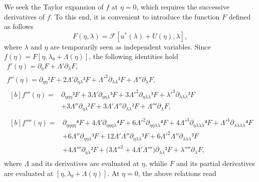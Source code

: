 \documentclass[12pt, final]{scrartcl}
\theoremstyle{definition}
\begin{document}
We seek the Taylor expansion of $f$ at $η = 0$, which requires the
successive derivatives of $f$. To this end, it is convenient to introduce the
function $F$ defined as follows
\begin{equation*}
  F(η, \lambda) =\mathcal{F}[u^{\ast}(\lambda) + U(η), \lambda],
\end{equation*}
where $\lambda$ and $η$ are temporarily seen as independent variables. Since
$f(η) = F[η, \lambda₀ + \Lambda(η)]$, the following identities hold
\begin{gather*}
  f'(η) = ∂_{η} F + \Lambda' ∂_{\lambda} F,\\
  f''(η) = ∂_{ηη}² F + 2\Lambda' ∂_{η\lambda}²F + \Lambda'^2 ∂_{\lambda\lambda}² F + \Lambda'' ∂_{\lambda} F,\\
  \begin{aligned}[b]
    f'''(η) ={}
    & ∂_{ηηη}³ F + 3\Lambda' ∂_{ηη\lambda}³F + 3\Lambda'^2 ∂_{η\lambda\lambda}³F + \lambda'^3 ∂_{\lambda\lambda\lambda}³ F\\
    & + 3\Lambda'' ∂_{η\lambda}² F + 3\Lambda' \Lambda'' ∂_{\lambda \lambda}² F + \Lambda''' ∂_{\lambda} F,
  \end{aligned}\\
  \begin{aligned}[b]
    f''''(η) ={}
    & ∂_{ηηηη}⁴ F + 4\Lambda' ∂_{ηηη\lambda}⁴F + 6\Lambda'^2 ∂_{ηη\lambda\lambda}⁴F + 4\Lambda'^3 ∂_{η\lambda\lambda\lambda}⁴F + \Lambda'^4 ∂_{\lambda\lambda\lambda\lambda}⁴ F\\
    & + 6\Lambda'' ∂_{ηη\lambda}³ F + 12\Lambda' \Lambda'' ∂_{η\lambda\lambda}³F + 6\Lambda'^2 \Lambda'' ∂_{\lambda\lambda\lambda}³ F\\
    & + 4 \Lambda''' ∂_{η\lambda}² F + \bigl( 3\Lambda''^2 + 4 \Lambda' \Lambda''' \bigr) ∂_{\lambda\lambda}² F + \lambda'''' ∂_{\lambda}F,
  \end{aligned}
\end{gather*}
where $\Lambda$ and its derivatives are evaluated at $η$, whilie $F$ and its
partial derivatives are evaluated at $[η, \lambda₀ + \Lambda(η)]$. At $η = 0$, the above
relations read
\end{document}
